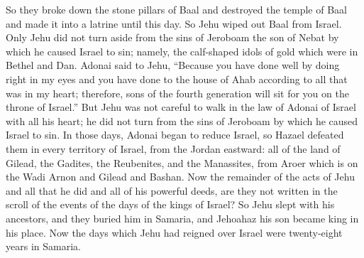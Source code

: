 \begin{biblechapter}
\verse So they broke down the stone pillars of Baal and destroyed the temple of Baal and made it into a latrine until this day.
\verse So Jehu wiped out Baal from Israel.
\verse Only Jehu did not turn aside from the sins of Jeroboam the son of Nebat by which he caused Israel to sin; namely, the calf-shaped idols of gold which were in Bethel and Dan.
\verse Adonai said to Jehu, “Because you have done well by doing right in my eyes and you have done to the house of Ahab according to all that was in my heart; therefore, sons of the fourth generation will sit for you on the throne of Israel.”
\verse But Jehu was not careful to walk in the law of Adonai of Israel with all his heart; he did not turn from the sins of Jeroboam by which he caused Israel to sin.
\verse In those days, Adonai began to reduce Israel, so Hazael defeated them in every territory of Israel,
\verse from the Jordan eastward: all of the land of Gilead, the Gadites, the Reubenites, and the Manassites, from Aroer which is on the Wadi Arnon and Gilead and Bashan.
\verse Now the remainder of the acts of Jehu and all that he did and all of his powerful deeds, are they not written in the scroll of the events of the days of the kings of Israel?
\verse So Jehu slept with his ancestors, and they buried him in Samaria, and Jehoahaz his son became king in his place.
\verse Now the days which Jehu had reigned over Israel were twenty-eight years in Samaria.
\end{biblechapter}

